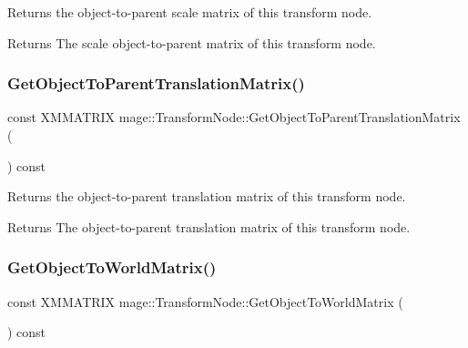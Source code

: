 Returns the object-\/to-\/parent scale matrix of this transform node.

\begin{DoxyReturn}{Returns}
The scale object-\/to-\/parent matrix of this transform node. 
\end{DoxyReturn}
\hypertarget{structmage_1_1_transform_node_a32c025e3ded200decae648f7e249dfe2}{}\label{structmage_1_1_transform_node_a32c025e3ded200decae648f7e249dfe2} 
\subsubsection{\texorpdfstring{Get\+Object\+To\+Parent\+Translation\+Matrix()}{GetObjectToParentTranslationMatrix()}}
{\footnotesize\ttfamily const X\+M\+M\+A\+T\+R\+IX mage\+::\+Transform\+Node\+::\+Get\+Object\+To\+Parent\+Translation\+Matrix (\begin{DoxyParamCaption}{ }\end{DoxyParamCaption}) const\hspace{0.3cm}{\ttfamily [noexcept]}}

Returns the object-\/to-\/parent translation matrix of this transform node.

\begin{DoxyReturn}{Returns}
The object-\/to-\/parent translation matrix of this transform node. 
\end{DoxyReturn}
\hypertarget{structmage_1_1_transform_node_a793fb089a973f6c03bcedabf58ce632e}{}\label{structmage_1_1_transform_node_a793fb089a973f6c03bcedabf58ce632e} 
\subsubsection{\texorpdfstring{Get\+Object\+To\+World\+Matrix()}{GetObjectToWorldMatrix()}}
{\footnotesize\ttfamily const X\+M\+M\+A\+T\+R\+IX mage\+::\+Transform\+Node\+::\+Get\+Object\+To\+World\+Matrix (\begin{DoxyParamCaption}{ }\end{DoxyParamCaption}) const\hspace{0.3cm}{\ttfamily [noexcept]}}

